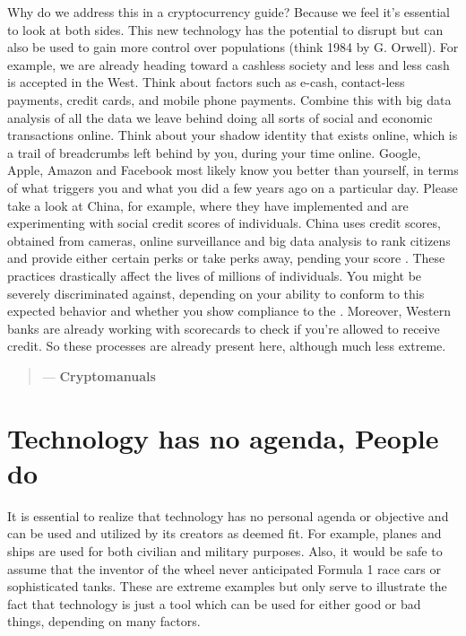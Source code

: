 \noindent Why do we address this in a cryptocurrency guide? Because we feel it's essential to look at both sides. This new technology has the potential to disrupt but can also be used to gain more control over populations (think 1984 by G. Orwell). For example, we are already heading toward a cashless society and less and less cash is accepted in the West. Think about factors such as e-cash, contact-less payments, credit cards, and mobile phone payments. Combine this with big data analysis of all the data we leave behind doing all sorts of social and economic transactions online. Think about your shadow identity that exists online, which is a trail of breadcrumbs left behind by you, during your time online. Google, Apple, Amazon and Facebook most likely know you better than yourself, in terms of what triggers you and what you did a few years ago on a particular day. Please take a look at China, for example, where they have implemented and are experimenting with social credit scores of individuals. China uses credit scores, obtained from cameras, online surveillance and big data analysis to rank citizens and provide either certain perks or take perks away, pending your score \parencite{chinasocialscores}. These practices drastically affect the lives of millions of individuals. You might be severely discriminated against, depending on your ability to conform to this expected behavior and whether you show compliance to the . Moreover, Western banks are already working with scorecards to check if you're allowed to receive credit. So these processes are already present here, although much less extreme.\medskip


\begin{quotation}

      \textit{}
      \begin{flushright}
        \small{--- \textbf{Cryptomanuals}}
      \end{flushright}
    
\end{quotation}

\section{Technology has no agenda, People do}
It is essential to realize that technology has no personal agenda or objective and can be used and utilized by its creators as deemed fit. For example, planes and ships are used for both civilian and military purposes. Also, it would be safe to assume that the inventor of the wheel never anticipated Formula 1 race cars or sophisticated tanks. These are extreme examples but only serve to illustrate the fact that technology is just a tool which can be used for either good or bad things, depending on many factors.\medskip 

